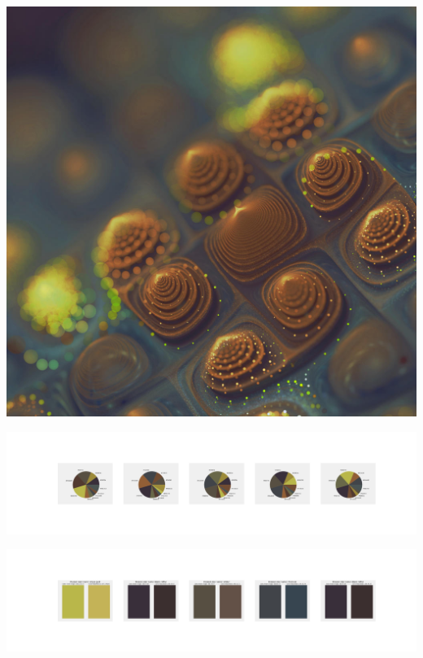 \documentclass[11pt]{article}
\begin{document}
\begin{landscape}
    \begin{center}
    \includegraphics[width=\textwidth]{./nbimg/file (303).jpg}
    \end{center}

    \begin{center}
    \includegraphics[width=250mm]{./nbimg/pie-227.jpg}
    \end{center}

    \begin{center}
    \includegraphics[width=250mm]{./nbimg/peak-227.jpg}
    \end{center}
    


\end{landscape}
\end{document}
